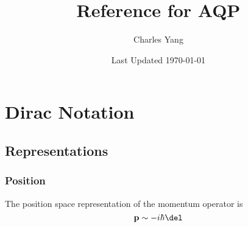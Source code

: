 \documentclass{article}
\title{Reference for AQP}
\author{\vspace{-1em}Charles Yang}
\date{\vspace{-1em}Last Updated \today}
\begin{document}
\vspace{-1in}
\maketitle
\vspace{-.5in}
\section{Dirac Notation}
\subsection{Representations}
\subsubsection{Position}
The position space representation of the momentum operator is
\begin{equation}
	\vb p\sim -i\hbar \del
\end{equation}
\end{document}
